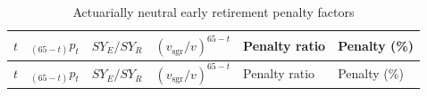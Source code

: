 \documentclass[
  letterpaper,
  DIV=11,
  numbers=noendperiod]{scrreprt}
\begin{document}
\begin{longtable}[]{@{}
  >{\raggedright\arraybackslash}p{}
  >{\raggedleft\arraybackslash}p{}
  >{\raggedleft\arraybackslash}p{}
  >{\raggedleft\arraybackslash}p{}
  >{\raggedleft\arraybackslash}p{}
  >{\raggedleft\arraybackslash}p{}@{}}
\caption{Actuarially neutral early retirement penalty
factors}\label{tbl-penaltyFactors}\tabularnewline
\toprule\noalign{}
\begin{minipage}[b]{\linewidth}\raggedright
\(t\)
\end{minipage} & \begin{minipage}[b]{\linewidth}\raggedleft
\({}_{(65-t)}p_t\)
\end{minipage} & \begin{minipage}[b]{\linewidth}\raggedleft
\(SY_E/SY_R\)
\end{minipage} & \begin{minipage}[b]{\linewidth}\raggedleft
\((v_{\text{sgr}}/v)^{65-t}\)
\end{minipage} & \begin{minipage}[b]{\linewidth}\raggedleft
Penalty ratio
\end{minipage} & \begin{minipage}[b]{\linewidth}\raggedleft
Penalty (\%)
\end{minipage} \\
\midrule\noalign{}
\endfirsthead
\toprule\noalign{}
\begin{minipage}[b]{\linewidth}\raggedright
\(t\)
\end{minipage} & \begin{minipage}[b]{\linewidth}\raggedleft
\({}_{(65-t)}p_t\)
\end{minipage} & \begin{minipage}[b]{\linewidth}\raggedleft
\(SY_E/SY_R\)
\end{minipage} & \begin{minipage}[b]{\linewidth}\raggedleft
\((v_{\text{sgr}}/v)^{65-t}\)
\end{minipage} & \begin{minipage}[b]{\linewidth}\raggedleft
Penalty ratio
\end{minipage} & \begin{minipage}[b]{\linewidth}\raggedleft
Penalty (\%)
\end{minipage} \\

\end{longtable}
\end{document}
